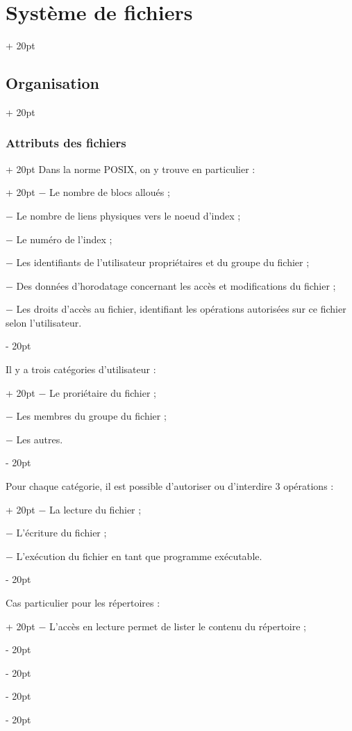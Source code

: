 \documentclass[a4paper, 12pt, twoside]{article}
\renewcommand{\emph}{\textcolor{ff4500}}
\newcommand{\ind}[1][20pt]{\advance\leftskip + #1}
\newcommand{\deind}[1][20pt]{\advance\leftskip - #1}
\newenvironment{indentedenv}[1][20pt]{\par \ind[#1]}{\par \deind}
\newenvironment{indt}[2][20pt]{#2 \begin{indentedenv}[#1]}{\end{indentedenv}} %
\begin{document}
\begin{indt}{\section{Système de fichiers}}
\begin{indt}{\subsection{Organisation}}
\begin{indt}{\subsubsection{Attributs des fichiers}}
\begin{indt}{Dans la norme POSIX, on y trouve en particulier :}
                    $-$ Le nombre de blocs alloués ;
                    
                    $-$ Le nombre de liens physiques vers le noeud d'index ;
                    
                    $-$ Le numéro de l'index ;
                    
                    $-$ Les identifiants de l'utilisateur propriétaires et du groupe du fichier ;
                    
                    $-$ Des données d'horodatage concernant les accès et modifications du fichier ;
                    
                    $-$ Les droits d'accès au fichier, identifiant les opérations autorisées sur ce fichier selon l'utilisateur.
                \end{indt}
                
                \vspace{6pt}
                
                \begin{indt}{Il y a trois catégories d'utilisateur :}
                    $-$ Le proriétaire du fichier ;
                    
                    $-$ Les membres du groupe du fichier ;
                    
                    $-$ Les autres.
                \end{indt}
                
                \vspace{6pt}
                
                \begin{indt}{Pour chaque catégorie, il est possible d'autoriser ou d'interdire 3 opérations :}
                    $-$ La \emph{lecture} du fichier ;
                    
                    $-$ L'\emph{écriture} du fichier ;
                    
                    $-$ L'\emph{exécution} du fichier en tant que programme exécutable.
                \end{indt}
                
                \vspace{6pt}
                
                \begin{indt}{Cas particulier pour les répertoires :}
                    $-$ L'accès en lecture permet de lister le contenu du répertoire ;
                    

\end{indt}
\end{indt}
\end{indt}
\end{indt}
\end{document}
